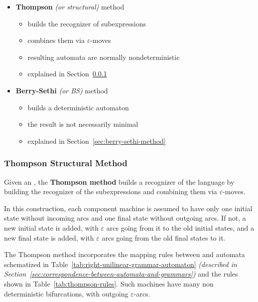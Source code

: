 \documentclass[english]{article}
\begin{document}
\begin{itemize}
  \item \textbf{Thompson} \textit{(or structural)} method
        \begin{itemize}
          \item builds the recognizer of subexpressions
          \item combines them via \(\varepsilon\)-moves
          \item resulting automata are normally nondeterministic
          \item explained in Section~\ref{sec:thompson-structural-method}
        \end{itemize}
  \item \textbf{Berry-Sethi} \textit{(or BS)} method
        \begin{itemize}
          \item builds a deterministic automaton
          \item the result is not necessarily minimal
          \item explained in Section~\ref{sec:berry-sethi-method}
        \end{itemize}
\end{itemize}

\subsubsection{Thompson Structural Method}
\label{sec:thompson-structural-method}

Given an \re, the \textbf{Thompson method} builds a recognizer of the language by building the recognizer of the subexpressions and combining them via \(\varepsilon\)-moves.

In this construction, each component machine is assumed to have only one initial state without incoming arcs and one final state without outgoing arcs.
If not, a new initial state is added, with \(\varepsilon\) arcs going from it to the old initial states, and a new final state is added, with \(\varepsilon\) arcs going from the old final states to it.

The Thompson method incorporates the mapping rules between \re and automata schematized in Table~\ref{tab:right-unilinear-grammar-automaton} \textit{(described in Section~\ref{sec:correspondence-between-automata-and-grammars})} and the rules shown in Table~\ref{tab:thompson-rules}.
Such machines have many non deterministic bifurcations, with outgoing \(\varepsilon\)-arcs.
\end{document}
